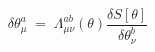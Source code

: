 \begin{equation}
\delta \theta_\mu^a \;=\; \Lambda_{\mu\nu}^{ab}(\theta) \frac{\delta
S[\theta]}{\delta \theta_\nu^b} 
\end{equation}

